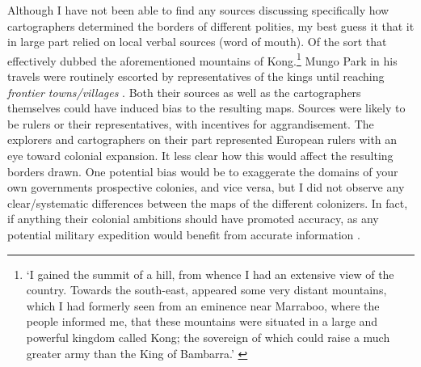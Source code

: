\documentclass[12pt]{article}
\begin{document}
Although I have not been able to find any sources discussing specifically how
cartographers determined the borders of different polities, my best guess it
that it in large part relied on local verbal sources (word of mouth). Of the
sort that effectively dubbed the aforementioned mountains of Kong.\footnote{`I
	gained the summit of a hill, from whence I had an extensive view of the
	country. Towards the south-east, appeared some very distant mountains,
	which I had formerly seen from an eminence near Marraboo, where the
people informed me, that these mountains were situated in a large and powerful
kingdom called Kong; the sovereign of which could raise a much greater army than
the King of Bambarra.' \citep[CHAPTER XVIII]{ParkMungo2015Titi}} Mungo Park in
his travels were routinely escorted by representatives of the kings until
reaching \textit{frontier towns/villages} \citep{ParkMungo2015Titi}. Both their
sources as well as the cartographers themselves could have induced bias to the
resulting maps. Sources were likely to be rulers or their representatives, with
incentives for aggrandisement. The explorers and cartographers on their part
represented European rulers with an eye toward colonial expansion. It less clear
how this would affect the resulting borders drawn. One potential bias would be
to exaggerate the domains of your own governments prospective colonies, and vice
versa, but I did not observe any clear/systematic differences between the maps
of the different colonizers. In fact, if anything their colonial ambitions
should have promoted accuracy, as any potential military expedition would
benefit from accurate information \citep{Bassett_1994}.
\end{document}
